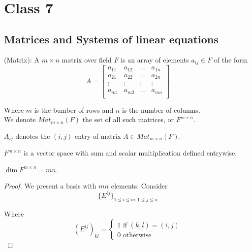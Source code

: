 \section{Class 7}

\subsection{Matrices and Systems of linear equations} 

\begin{definition}
(Matrix): A $m \times n$ matrix over field $F$ is an array of elements $a_{ij} \in F$ of the form 
    \[
        A = 
        \begin{bmatrix} 
            a_{11} & a_{12} & \hdots & a_{1 n} \\
            a_{21} & a_{22} & \hdots & a_{2 n} \\
            \vdots & \vdots & \vdots & \vdots \\
            a_{m1} & a_{m2} & \hdots & a_{m n} \\
        \end{bmatrix}
    \]

    Where $m$ is the bumber of rows and $n$ is the number of columns. \\

    We denote $Mat_{m \times n}(F)$ the set of all such matrices, or $F^{m \times n}$. \\
\end{definition} 

\begin{notation}
$A_{ij}$ denotes the $(i, j)$ entry of matrix $A \in Mat_{m \times n}(F)$. \\
\end{notation}

\begin{remark}
$F^{m \times n}$ is a vector space with sum and scalar multiplication defined entrywise. 
\end{remark}

\begin{remark}
$\dim F^{ m \times n} = mn$. \\
\end{remark}

\begin{proof}
We present a basis with $mn$ elements. Consider 
\[
{ \{ E^{i j} \} }_{{1 \leq i \leq m, 1 \leq j \leq n}}
\] 

Where 
\[
  \left( E^{i j} \right)_{kl} = \begin{cases}
    1 \text{ if } (k, l) = (i, j) \\
    0 \text{ otherwise}
  \end{cases}
\]
\end{proof}


